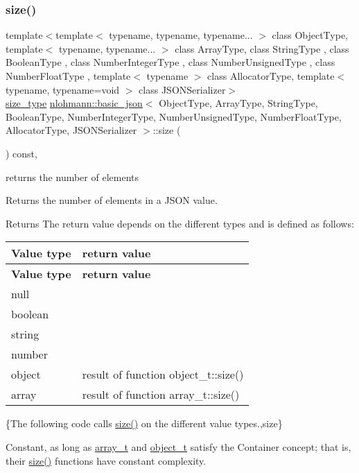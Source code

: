 \subsubsection{\texorpdfstring{size()}{size()}}
{\footnotesize\ttfamily template$<$template$<$ typename, typename, typename... $>$ class Object\+Type, template$<$ typename, typename... $>$ class Array\+Type, class String\+Type , class Boolean\+Type , class Number\+Integer\+Type , class Number\+Unsigned\+Type , class Number\+Float\+Type , template$<$ typename $>$ class Allocator\+Type, template$<$ typename, typename=void $>$ class J\+S\+O\+N\+Serializer$>$ \\
\hyperlink{classnlohmann_1_1basic__json_a39f2cd0b58106097e0e67bf185cc519b}{size\+\_\+type} \hyperlink{classnlohmann_1_1basic__json}{nlohmann\+::basic\+\_\+json}$<$ Object\+Type, Array\+Type, String\+Type, Boolean\+Type, Number\+Integer\+Type, Number\+Unsigned\+Type, Number\+Float\+Type, Allocator\+Type, J\+S\+O\+N\+Serializer $>$\+::size (\begin{DoxyParamCaption}{ }\end{DoxyParamCaption}) const\hspace{0.3cm}{\ttfamily [inline]}, {\ttfamily [noexcept]}}



returns the number of elements 

Returns the number of elements in a J\+S\+ON value.

\begin{DoxyReturn}{Returns}
The return value depends on the different types and is defined as follows\+: \tabulinesep=1mm
\begin{longtabu} spread 0pt [c]{*{2}{|X[-1]}|}
\hline
\rowcolor{\tableheadbgcolor}\textbf{ Value type }&\textbf{ return value  }\\
\endfirsthead
\hline
\endfoot
\hline
\rowcolor{\tableheadbgcolor}\textbf{ Value type }&\textbf{ return value  }\\
\endhead
null &{} \\
boolean &{} \\
string &{} \\
number &{} \\
object &result of function object\+\_\+t\+::size() \\
array &result of function array\+\_\+t\+::size() \\
\end{longtabu}
\{The following code calls {\ttfamily \hyperlink{classnlohmann_1_1basic__json_a25e27ad0c6d53c01871c5485e1f75b96}{size()}} on the different value types.,size\}
\end{DoxyReturn}
Constant, as long as \hyperlink{classnlohmann_1_1basic__json_ae095578e03df97c5b3991787f1056374}{array\+\_\+t} and \hyperlink{classnlohmann_1_1basic__json_a5e48a7893520e1314bf0c9723e26ea2a}{object\+\_\+t} satisfy the Container concept; that is, their \hyperlink{classnlohmann_1_1basic__json_a25e27ad0c6d53c01871c5485e1f75b96}{size()} functions have constant complexity.

